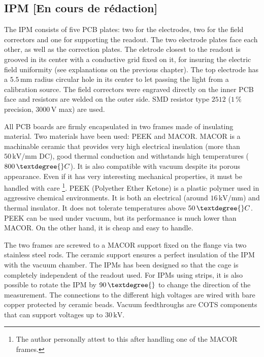 \begin{refsection}
  \subsection{IPM [En cours de rédaction]}
  
  The IPM consists of five PCB plates: two for the electrodes, two for the field correctors and one for supporting the readout. The two electrode plates face each other, as well as the correction plates. The eletrode closest to the readout is grooved in its center with a conductive grid fixed on it, for insuring the electric field uniformity (see explanations on the previous chapter). The top electrode has a $5.5\,\mathrm{mm}$ radius circular hole in its center to let passing the light from a calibration source. The field correctors were engraved directly on the inner PCB face and resistors are welded on the outer side. SMD resistor type $2512$ ($1\,\mathrm{\%}$ precision, $3000\,\mathrm{V}$ max) are used.

  All PCB boards are firmly encapsulated in two frames made of insulating material. Two materials have been used: PEEK and MACOR. MACOR is a machinable ceramic that provides very high electrical insulation (more than $50\,\mathrm{kV/mm}$ DC),  good thermal conduction and withstands high temperatures ($800\,\textdegree{}C$). It is also compatible with vacuum despite its porous appearance. Even if it has very interesting mechanical properties, it must be handled with care \footnote{The author personally attest to this after handling one of the MACOR frames.}. PEEK (Polyether Ether Ketone) is a plastic polymer used in aggressive chemical environments. It is both an electrical (around $16\,\mathrm{kV/mm}$) and thermal insulator. It does not tolerate temperatures above $50\,\textdegree{}C$. PEEK can be used under vacuum, but its performance is much lower than MACOR. On the other hand, it is cheap and easy to handle.

  The two frames are screwed to a MACOR support fixed on the flange via two stainless steel rods. The ceramic support ensures a perfect insulation of the IPM with the vacuum chamber. The IPMs has been designed so that the cage is completely independent of the readout used. For IPMs using strips, it is also possible to rotate the IPM by $90\,\textdegree{}$ to change the direction of the measurement. The connections to the different high voltages are wired with bare copper  protected by ceramic beads. Vacuum feedthroughs are COTS components that can support voltages up to $30\,\mathrm{kV}$.


\end{refsection}
